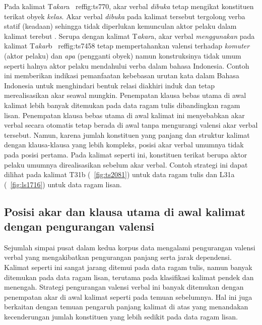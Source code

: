 Pada kalimat T\textit{akar}a \pic~ref{fig:ts770}, akar verbal \textit{dibuka} tetap mengikat konstituen terikat obyek \textit{kelas}. Akar verbal \textit{dibuka} pada kalimat tersebut tergolong verba statif (keadaan) sehingga tidak diperlukan kemunculan aktor pelaku dalam kalimat terebut \cite{sneddon2010indonesian}. Serupa dengan kalimat T\textit{akar}a, akar verbal \textit{menggunakan} pada kalimat T\textit{akar}b \pic~ref{fig:ts7458} tetap mempertahankan valensi terhadap \textit{komuter} (aktor pelaku) dan \textit{apa} (pengganti obyek) namun konstruksinya tidak umum seperti halnya aktor pelaku mendahului verba dalam bahasa Indonesia. Contoh ini memberikan indikasi pemanfaatan kebebasan urutan kata dalam Bahasa Indonesia untuk menghindari bentuk relasi diakhiri induk dan tetap merealisasikan akar seawal mungkin. Penempatan klausa bebas utama di awal kalimat lebih banyak ditemukan pada data ragam tulis dibandingkan ragam lisan. Penempatan klausa bebas utama di awal kalimat ini menyebabkan akar verbal secara otomatis tetap berada di awal tanpa mengurangi valensi akar verbal tersebut. Namun, karena jumlah konstituen yang panjang dan struktur kalimat dengan klausa-klausa yang lebih kompleks, posisi akar verbal umumnya tidak pada posisi pertama. Pada kalimat seperti ini, konstituen terikat berupa aktor pelaku umumnya direalisasikan sebelum akar verbal. Contoh strategi ini dapat dilihat pada kalimat T31b (\pic~\ref{fig:ts2081}) untuk data ragam tulis dan L31a (\pic~\ref{fig:ls1716}) untuk data ragam lisan.

\subsection{Posisi akar dan klausa utama di awal kalimat dengan pengurangan valensi}
Sejumlah simpai pusat dalam kedua korpus data mengalami pengurangan valensi verbal yang mengakibatkan pengurangan panjang serta jarak dependensi. Kalimat seperti ini sangat jarang ditemui pada data ragam tulis, namun banyak ditemukan pada data ragam lisan, terutama pada klasifikasi kalimat pendek dan menengah. Strategi pengurangan valensi verbal ini banyak ditemukan dengan penempatan akar di awal kalimat seperti pada temuan sebelumnya. Hal ini juga berkaitan dengan temuan pengaruh panjang kalimat di atas yang menandakan kecenderungan jumlah konstituen yang lebih sedikit pada data ragam lisan.  

